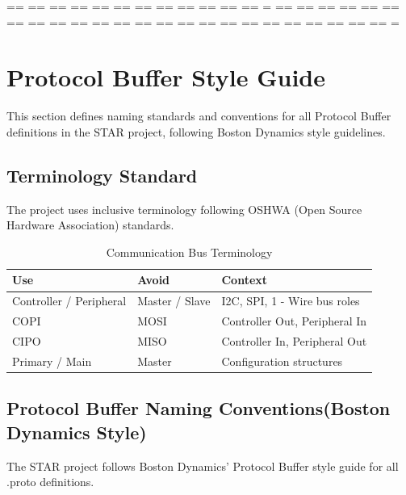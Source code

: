     == == == == == == == == == == == ==
    = %
      == == == == == == == == == == == == == == == == == == == == == == == ==
    =

\newpage
\section{Protocol Buffer Style Guide
}
\label{sec:protobuf-style}

This section defines naming standards and conventions for all Protocol Buffer definitions in the STAR project, following Boston Dynamics style guidelines.

\subsection{Terminology Standard}

The project uses inclusive terminology following OSHWA (Open Source Hardware Association) standards.

\begin{table}[H]
\centering
\caption{Communication Bus Terminology}
\label{tab:inclusive-terminology}
\begin{tabular} { | l | l | p{6cm} |}
\hline
\textbf{Use} & \textbf{Avoid} & \textbf{Context}
\\
\hline Controller / Peripheral &Master / Slave &I2C, SPI,
    1 - Wire bus roles \\
COPI &MOSI &Controller Out,
    Peripheral In \\
CIPO &MISO &Controller In,
    Peripheral Out \\
Primary / Main &Master &Configuration structures \\
\hline
\end{tabular}
\end{table}

\subsection{Protocol Buffer Naming Conventions(Boston Dynamics Style)}

The STAR project follows Boston Dynamics' Protocol Buffer style guide for all .proto definitions.

